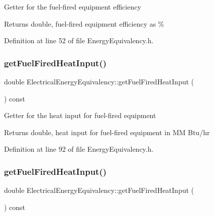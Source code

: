 Getter for the fuel-\/fired equipment efficiency

\begin{DoxyReturn}{Returns}
double, fuel-\/fired equipment efficiency as \% 
\end{DoxyReturn}


Definition at line 52 of file Energy\+Equivalency.\+h.

\mbox{\label{class_electrical_energy_equivalency_acb07f4cd7d416922bc355b2f1b3aadb4}} 
\subsubsection{\texorpdfstring{get\+Fuel\+Fired\+Heat\+Input()}{getFuelFiredHeatInput()}\hspace{0.1cm}{\footnotesize\ttfamily [1/3]}}
{\footnotesize\ttfamily double Electrical\+Energy\+Equivalency\+::get\+Fuel\+Fired\+Heat\+Input (\begin{DoxyParamCaption}{ }\end{DoxyParamCaption}) const\hspace{0.3cm}{\ttfamily [inline]}}

Getter for the heat input for fuel-\/fired equipment

\begin{DoxyReturn}{Returns}
double, heat input for fuel-\/fired equipment in MM Btu/hr 
\end{DoxyReturn}


Definition at line 92 of file Energy\+Equivalency.\+h.

\mbox{\label{class_electrical_energy_equivalency_acb07f4cd7d416922bc355b2f1b3aadb4}} 
\subsubsection{\texorpdfstring{get\+Fuel\+Fired\+Heat\+Input()}{getFuelFiredHeatInput()}\hspace{0.1cm}{\footnotesize\ttfamily [2/3]}}
{\footnotesize\ttfamily double Electrical\+Energy\+Equivalency\+::get\+Fuel\+Fired\+Heat\+Input (\begin{DoxyParamCaption}{ }\end{DoxyParamCaption}) const\hspace{0.3cm}{\ttfamily [inline]}}

